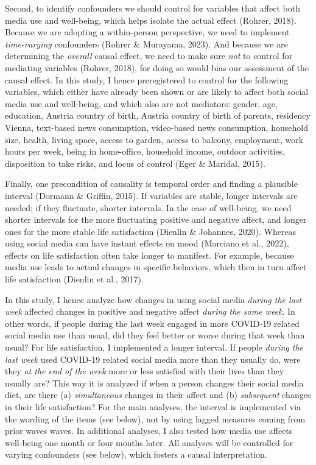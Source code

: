 \documentclass[
  man,mask,floatsintext]{apa7}
\begin{document}
Second, to identify confounders we should control for variables that affect both media use and well-being, which helps isolate the actual effect (Rohrer, 2018).
Because we are adopting a within-person perspective, we need to implement \emph{time-varying} confounders (Rohrer \& Murayama, 2023).
And because we are determining the \emph{overall} causal effect, we need to make sure \emph{not} to control for mediating variables (Rohrer, 2018), for doing so would bias our assessment of the causal effect.
In this study, I hence preregistered to control for the following variables, which either have already been shown or are likely to affect both social media use and well-being, and which also are not mediators:
gender, age, education, Austria country of birth, Austria country of birth of parents, residency Vienna, text-based news consumption, video-based news consumption, household size, health, living space, access to garden, access to balcony, employment, work hours per week, being in home-office, household income, outdoor activities, disposition to take risks, and locus of control (Eger \& Maridal, 2015).

Finally, one precondition of causality is temporal order and finding a plausible interval (Dormann \& Griffin, 2015).
If variables are stable, longer intervals are needed; if they fluctuate, shorter intervals.
In the case of well-being, we need shorter intervals for the more fluctuating positive and negative affect, and longer ones for the more stable life satisfaction (Dienlin \& Johannes, 2020).
Whereas using social media can have instant effects on mood (Marciano et al., 2022), effects on life satisfaction often take longer to manifest.
For example, because media use leads to actual changes in specific behaviors, which then in turn affect life satisfaction (Dienlin et al., 2017).

In this study, I hence analyze how changes in using social media \emph{during the last week} affected changes in positive and negative affect \emph{during the same week}.
In other words, if people during the last week engaged in more COVID-19 related social media use than usual, did they feel better or worse during that week than usual?
For life satisfaction, I implemented a longer interval.
If people \emph{during the last week} used COVID-19 related social media more than they usually do, were they \emph{at the end of the week} more or less satisfied with their lives than they usually are?
This way it is analyzed if when a person changes their social media diet, are there (a) \emph{simultaneous} changes in their affect and (b) \emph{subsequent} changes in their life satisfaction?
For the main analyses, the interval is implemented via the wording of the items (see below), not by using lagged measures coming from prior waves waves.
In additional analyses, I also tested how media use affects well-being one month or four months later.
All analyses will be controlled for varying confounders (see below), which fosters a causal interpretation.
\end{document}
